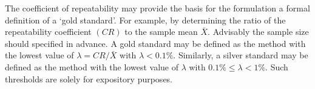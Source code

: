 \documentclass[12pt, a4paper]{report}
\theoremstyle{plain}
\theoremstyle{definition}
\theoremstyle{remark}
\begin{document}
	
	The coefficient of repeatability may provide the basis for the formulation a formal definition of a `gold standard'. For example, by determining the ratio of the repeatability coefficient $(CR)$ to the sample mean $\bar{X}$. Advisably the sample size should specified in advance. A gold standard may be defined as the method with the lowest value of $\lambda = CR /\bar{X}$ with $\lambda < 0.1\%$. Similarly, a silver standard may be defined as the method with the lowest value of $\lambda $ with $0.1\% \leq \lambda < 1\%$. Such thresholds are solely for expository purposes.

%
%
%	
%
%
%		
%	
%	
	

	


	
	

	
	
\end{document}
